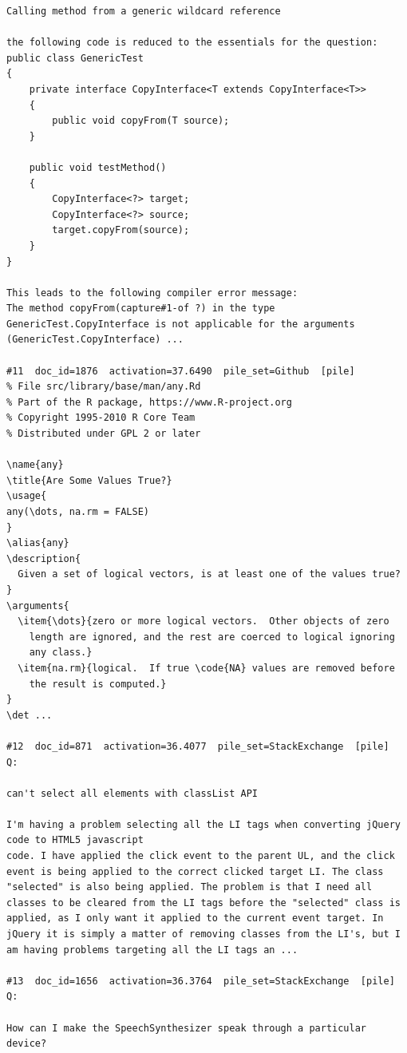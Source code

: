 \begin{verbatim}
Calling method from a generic wildcard reference

the following code is reduced to the essentials for the question:
public class GenericTest 
{
    private interface CopyInterface<T extends CopyInterface<T>>
    {
        public void copyFrom(T source);
    }

    public void testMethod()
    {
        CopyInterface<?> target;
        CopyInterface<?> source;
        target.copyFrom(source);
    }
}

This leads to the following compiler error message:
The method copyFrom(capture#1-of ?) in the type GenericTest.CopyInterface is not applicable for the arguments (GenericTest.CopyInterface) ...

#11  doc_id=1876  activation=37.6490  pile_set=Github  [pile]
% File src/library/base/man/any.Rd
% Part of the R package, https://www.R-project.org
% Copyright 1995-2010 R Core Team
% Distributed under GPL 2 or later

\name{any}
\title{Are Some Values True?}
\usage{
any(\dots, na.rm = FALSE)
}
\alias{any}
\description{
  Given a set of logical vectors, is at least one of the values true?
}
\arguments{
  \item{\dots}{zero or more logical vectors.  Other objects of zero
    length are ignored, and the rest are coerced to logical ignoring
    any class.}
  \item{na.rm}{logical.  If true \code{NA} values are removed before
    the result is computed.}
}
\det ...

#12  doc_id=871  activation=36.4077  pile_set=StackExchange  [pile]
Q:

can't select all elements with classList API

I'm having a problem selecting all the LI tags when converting jQuery code to HTML5 javascript
code. I have applied the click event to the parent UL, and the click event is being applied to the correct clicked target LI. The class "selected" is also being applied. The problem is that I need all classes to be cleared from the LI tags before the "selected" class is applied, as I only want it applied to the current event target. In jQuery it is simply a matter of removing classes from the LI's, but I am having problems targeting all the LI tags an ...

#13  doc_id=1656  activation=36.3764  pile_set=StackExchange  [pile]
Q:

How can I make the SpeechSynthesizer speak through a particular device?


\end{verbatim}

